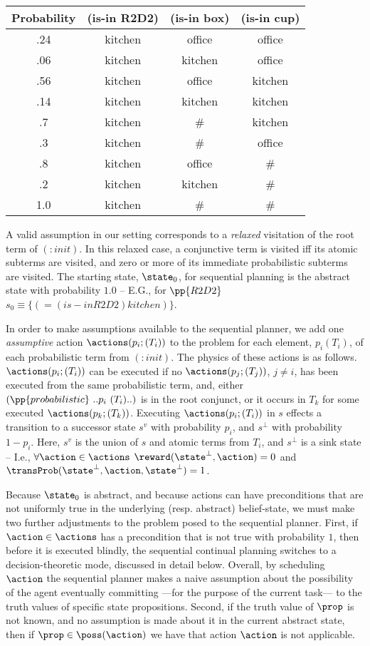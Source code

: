 \small
\begin{tabular}{cccc}
\hline
Probability & (is-in R2D2)  & (is-in box)  & (is-in cup) \\
\hline
.24 & kitchen & office & office \\
.06 & kitchen & kitchen & office \\
.56 & kitchen & office & kitchen \\
.14 & kitchen & kitchen & kitchen \\
.7 & kitchen & \# &  kitchen\\
.3 & kitchen & \# & office \\
.8 & kitchen & office & \# \\
.2 & kitchen & kitchen & \# \\
1.0 & kitchen & \# & \# \\
\hline
\end{tabular}
\normalsize

\noindent A valid assumption in our setting corresponds to a {\em
relaxed} visitation of the root term of $(:init)$. In this relaxed
case, a conjunctive term is visited iff its atomic subterms are
visited, and zero or more of its immediate probabilistic subterms are
visited. The starting state, $\state_0$, for sequential planning is
the abstract state with probability $1.0$ -- E.G., for $\pp{R2D2}$
$s_0 \equiv \{(= (is-in R2D2) kitchen)\}$.

In order to make assumptions available to the sequential planner, we
add one {\em assumptive} action $\actions(p_i;(T_i))$ to the problem
for each element, $p_i (T_i)$, of each probabilistic term from
$(:init)$. The physics of these actions is as
follows. $\actions(p_i;(T_i))$ can be executed if no
$\actions(p_j;(T_j))$, $j \neq i$, has been executed from the same
probabilistic term, and, either $(\pp{probabilistic}~..p_i~(T_i)..)$
is in the root conjunct, or it occurs in $T_k$ for some executed
$\actions(p_k;(T_k))$.
Executing $\actions(p_i;(T_i))$ in $s$ effects a transition to a
successor state $s^v$ with probability $p_i$, and $s^\bot$ with
probability $1 - p_i$. Here, $s^v$ is the union of $s$ and atomic
terms from $T_i$, and $s^\bot$ is a sink state -- I.e.,
$\forall\action\in\actions$ $\reward(\state^\bot, \action) = 0$ and
$\transProb(\state^\bot, \action, \state^\bot) = 1$.

Because $\state_0$ is abstract, and because actions can have
preconditions that are not uniformly true in the underlying
(resp. abstract) belief-state, we must make two further adjustments to
the problem posed to the sequential planner. First, if
$\action\in\actions$ has a precondition that is not true with
probability $1$, then before it is executed blindly, the sequential
continual planning switches to a decision-theoretic mode, discussed in
detail below. Overall, by scheduling $\action$ the sequential planner
makes a naive assumption about the possibility of the agent eventually
committing ---for the purpose of the current task--- to the truth
values of specific state propositions. Second, if the truth value of
$\prop$ is not known, and no assumption is made about it in the
current abstract state, then if $\prop \in \poss(\action)$ we have
that action $\action$ is not applicable.

